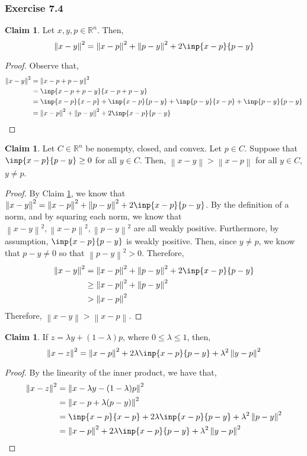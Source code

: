 \documentclass[letterpaper,12pt]{article}
\theoremstyle{definition}
\newtheorem{claim}[theorem]{Claim}
\newcommand{\norm}[1]{\left\lVert#1\right\rVert}
\begin{document}
\subsubsection*{Exercise 7.4} 
\begin{claim}\label{clm1}
	Let $x, y, p \in \mathbb{R}^n$. Then,
	\begin{equation}
		\norm{x-y}^2 = \norm{x-p}^2 + \norm{p-y}^2 + 2\inp{x-p}{p-y}
	\end{equation}
\end{claim}
\begin{proof}
Observe that,
\begin{align*}
	\norm{x-y}^2 &= \norm{x -p + p -y}^2 \\
	&= \inp{x -p + p -y}{x -p + p -y} \\
	&= \inp{x-p}{x-p} + \inp{x-p}{p-y} + \inp{p-y}{x-p} + \inp{p-y}{p-y} \\
	&= \norm{x-p}^2 + \norm{p-y}^2 + 2\inp{x-p}{p-y}
\end{align*}
\end{proof}

\begin{claim}\label{iff}
	Let $C \in \mathbb{R}^n$ be nonempty, closed, and convex. Let $p \in C$. Suppose that $\inp{x-p}{p-y} \geq 0$ for all $y \in C$. Then, $\norm{x - y} > \norm{x-p}$ for all $y \in C$, $y \neq p$. 
\end{claim}
\begin{proof}
	By Claim \ref{clm1}, we know that $\norm{x-y}^2 = \norm{x-p}^2 + \norm{p-y}^2 + 2\inp{x-p}{p-y}$. By the definition of a norm, and by squaring each norm, we know that $\norm{x-y}^2, \norm{x-p}^2, \norm{p-y}^2$ are all weakly positive. Furthermore, by assumption, $\inp{x-p}{p-y}$ is weakly positive. Then, since $y \neq p$, we know that $ p - y \neq 0$ so that $\norm{p-y}^2 > 0$. Therefore, 
	\begin{align*}
		\norm{x-y}^2 &= \norm{x-p}^2 + \norm{p-y}^2 + 2\inp{x-p}{p-y} \\
		&\geq \norm{x-p}^2 + \norm{p-y}^2 \\
		&>\norm{x-p}^2
	\end{align*}
	Therefore, $\norm{x-y} > \norm{x-p}$. 
\end{proof}

\begin{claim}\label{clm3}
	If $z = \lambda y + (1 - \lambda)p$, where $0 \leq \lambda \leq 1$, then,
	\begin{equation}
		\norm{x-z}^2 = \norm{x-p}^2 + 2\lambda\inp{x-p}{p-y} + \lambda^2 \norm{y-p}^2
	\end{equation}
\end{claim}
\begin{proof}
	By the linearity of the inner product, we have that,
	\begin{align*}
	\norm{x-z}^2 &= \norm{x-\lambda y - (1 - \lambda)p}^2 \\
	&= \norm{x - p +\lambda(p - y)}^2 \\
	&= \inp{x-p}{x-p} + 2\lambda\inp{x-p}{p-y} + \lambda^2\norm{p-y}^2 \\
	&=  \norm{x-p}^2+ 2\lambda\inp{x-p}{p-y} + \lambda^2\norm{y-p}^2
	\end{align*}
\end{proof}
\end{document}
